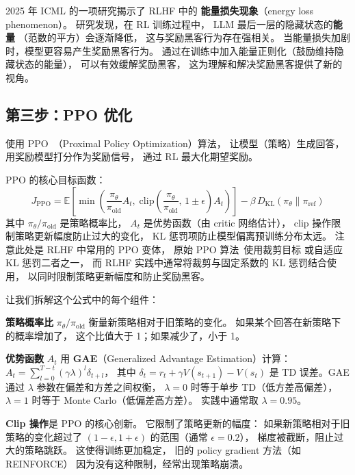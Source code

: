 \begin{warnbox}[能量损失现象与奖励黑客]
2025 年 ICML 的一项研究揭示了 RLHF 中的
\textbf{能量损失现象}（energy loss phenomenon）。
研究发现，在 RL 训练过程中，
LLM 最后一层的隐藏状态的\textbf{能量}
（范数的平方）会逐渐降低，
这与奖励黑客行为存在强相关。
当能量损失加剧时，模型更容易产生奖励黑客行为。
通过在训练中加入能量正则化（鼓励维持隐藏状态的能量），
可以有效缓解奖励黑客，
这为理解和解决奖励黑客提供了新的视角。
\end{warnbox}

\subsection{第三步：PPO 优化}

使用 PPO~\cite{schulman2017ppo}（Proximal Policy Optimization）算法，
让模型（策略）生成回答，
用奖励模型打分作为奖励信号，
通过 RL 最大化期望奖励。

PPO 的核心目标函数：
\begin{equation}
  J_{\mathrm{PPO}} = \mathbb{E}\!\left[
    \min\!\left(\frac{\pi_\theta}{\pi_{\mathrm{old}}} A_t,\;
    \mathrm{clip}\!\left(\frac{\pi_\theta}{\pi_{\mathrm{old}}},\,
    1 \pm \epsilon\right) A_t\right)
  \right] - \beta \, D_{\mathrm{KL}}(\pi_\theta \| \pi_{\mathrm{ref}})
\end{equation}
其中 $\pi_\theta / \pi_{\mathrm{old}}$ 是策略概率比，
$A_t$ 是优势函数（由 critic 网络估计），
clip 操作限制策略更新幅度防止过大的变化，
KL 惩罚项防止模型偏离预训练分布太远。
注意此处是 RLHF 中常用的 PPO 变体，
原始 PPO 算法~\cite{schulman2017ppo}使用裁剪目标
或自适应 KL 惩罚二者之一，
而 RLHF 实践中通常将裁剪与固定系数的 KL 惩罚结合使用，
以同时限制策略更新幅度和防止奖励黑客。

让我们拆解这个公式中的每个组件：

\textbf{策略概率比} $\pi_\theta / \pi_{\mathrm{old}}$
衡量新策略相对于旧策略的变化。
如果某个回答在新策略下的概率增加了，
这个比值大于 1；如果减少了，小于 1。

\textbf{优势函数} $A_t$ 用
\textbf{GAE}（Generalized Advantage Estimation）计算：
$A_t = \sum_{l=0}^{T-t} (\gamma \lambda)^l \delta_{t+l}$，
其中 $\delta_t = r_t + \gamma V(s_{t+1}) - V(s_t)$
是 TD 误差。GAE 通过 $\lambda$ 参数在偏差和方差之间权衡，
$\lambda = 0$ 时等于单步 TD（低方差高偏差），
$\lambda = 1$ 时等于 Monte Carlo（低偏差高方差）。
实践中通常取 $\lambda = 0.95$。

\textbf{Clip 操作}是 PPO 的核心创新。
它限制了策略更新的幅度：
如果新策略相对于旧策略的变化超过了 $(1-\epsilon, 1+\epsilon)$
的范围（通常 $\epsilon = 0.2$），
梯度被截断，阻止过大的策略跳跃。
这使得训练更加稳定，
旧的 policy gradient 方法（如 REINFORCE）
因为没有这种限制，经常出现策略崩溃。

